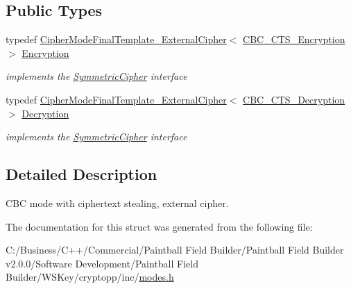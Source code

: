 \subsection*{Public Types}
\begin{DoxyCompactItemize}
\item 
\hypertarget{struct_c_b_c___c_t_s___mode___external_cipher_ac489281da057e155f2ecea432d8ad98d}{
typedef \hyperlink{class_cipher_mode_final_template___external_cipher}{CipherModeFinalTemplate\_\-ExternalCipher}$<$ \hyperlink{class_c_b_c___c_t_s___encryption}{CBC\_\-CTS\_\-Encryption} $>$ \hyperlink{struct_c_b_c___c_t_s___mode___external_cipher_ac489281da057e155f2ecea432d8ad98d}{Encryption}}
\label{struct_c_b_c___c_t_s___mode___external_cipher_ac489281da057e155f2ecea432d8ad98d}

\begin{DoxyCompactList}\small\item\em implements the \hyperlink{class_symmetric_cipher}{SymmetricCipher} interface \item\end{DoxyCompactList}\item 
\hypertarget{struct_c_b_c___c_t_s___mode___external_cipher_a733a9ac70d490a182c12a541ffa274f8}{
typedef \hyperlink{class_cipher_mode_final_template___external_cipher}{CipherModeFinalTemplate\_\-ExternalCipher}$<$ \hyperlink{class_c_b_c___c_t_s___decryption}{CBC\_\-CTS\_\-Decryption} $>$ \hyperlink{struct_c_b_c___c_t_s___mode___external_cipher_a733a9ac70d490a182c12a541ffa274f8}{Decryption}}
\label{struct_c_b_c___c_t_s___mode___external_cipher_a733a9ac70d490a182c12a541ffa274f8}

\begin{DoxyCompactList}\small\item\em implements the \hyperlink{class_symmetric_cipher}{SymmetricCipher} interface \item\end{DoxyCompactList}\end{DoxyCompactItemize}


\subsection{Detailed Description}
CBC mode with ciphertext stealing, external cipher. 

The documentation for this struct was generated from the following file:\begin{DoxyCompactItemize}
\item 
C:/Business/C++/Commercial/Paintball Field Builder/Paintball Field Builder v2.0.0/Software Development/Paintball Field Builder/WSKey/cryptopp/inc/\hyperlink{modes_8h}{modes.h}\end{DoxyCompactItemize}
